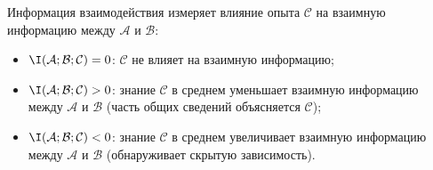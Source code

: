 \begin{remark}
	Информация взаимодействия измеряет влияние опыта $\mathcal{C}$ на взаимную информацию между $\mathcal{A}$ и $\mathcal{B}$:
	\begin{itemize}
		\item $\I(\mathcal{A};\mathcal{B};\mathcal{C}) = 0$: $\mathcal{C}$ не влияет на взаимную информацию;
		\item $\I(\mathcal{A};\mathcal{B};\mathcal{C}) > 0$: знание $\mathcal{C}$ в среднем уменьшает взаимную информацию между $\mathcal{A}$ и $\mathcal{B}$ (часть общих сведений объясняется $\mathcal{C}$);
		\item $\I(\mathcal{A};\mathcal{B};\mathcal{C}) < 0$: знание $\mathcal{C}$ в среднем увеличивает взаимную информацию между $\mathcal{A}$ и $\mathcal{B}$ (обнаруживает скрытую зависимость).
	\end{itemize}
\end{remark}

